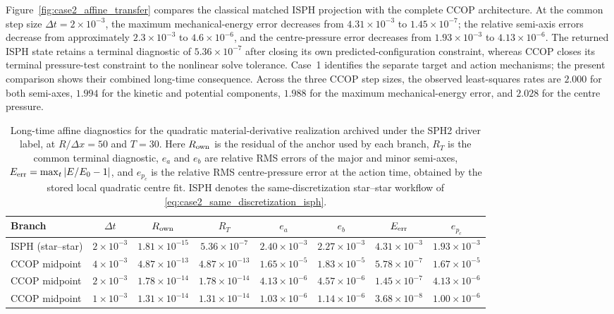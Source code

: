 \documentclass[11pt]{article}
\theoremstyle{plain}
\theoremstyle{definition}
\theoremstyle{remark}
\begin{document}
Figure~\ref{fig:case2_affine_transfer} compares the classical matched ISPH
projection with the complete CCOP architecture.  At the common step size
$\Delta t=2\times10^{-3}$, the maximum mechanical-energy error decreases from
$4.31\times10^{-3}$ to $1.45\times10^{-7}$; the relative semi-axis errors
decrease from approximately $2.3\times10^{-3}$ to $4.6\times10^{-6}$, and the
centre-pressure error decreases from $1.93\times10^{-3}$ to
$4.13\times10^{-6}$.  The returned ISPH state retains a terminal diagnostic of
$5.36\times10^{-7}$ after closing its own predicted-configuration constraint,
whereas CCOP closes its terminal pressure-test constraint to the nonlinear
solve tolerance.  Case~1 identifies the separate target and action mechanisms;
the present comparison shows their combined long-time consequence.  Across the
three CCOP step sizes, the observed
least-squares rates are $2.000$ for both semi-axes, $1.994$ for the kinetic and
potential components, $1.988$ for the maximum mechanical-energy error, and
$2.028$ for the centre pressure.

\begin{table}[t]
\centering
\caption{Long-time affine diagnostics for the quadratic material-derivative
realization archived under the SPH2 driver label, at
$R/\Delta x=50$ and $T=30$.  Here $R_{\rm own}$ is the residual of the anchor
used by each branch, $R_T$ is the common terminal diagnostic, $e_a$ and $e_b$
are relative RMS errors of the major and minor semi-axes,
$E_{\rm err}=\max_t|E/E_0-1|$, and $e_{p_c}$ is the relative RMS centre-pressure
error at the action time, obtained by the stored local quadratic centre fit.
ISPH denotes the same-discretization star--star workflow of
\eqref{eq:case2_same_discretization_isph}.}
\label{tab:case2_transfer_numbers}
\scriptsize
\setlength{\tabcolsep}{3.5pt}
\renewcommand{\arraystretch}{1.35}
\begin{tabular}{lccccccc}
\toprule
Branch & $\Delta t$ & $R_{\rm own}$ & $R_T$ & $e_a$ & $e_b$ &
$E_{\rm err}$ & $e_{p_c}$ \\
\midrule
ISPH (star--star) & $2{\times}10^{-3}$ & $1.81{\times}10^{-15}$ & $5.36{\times}10^{-7}$ & $2.40{\times}10^{-3}$ & $2.27{\times}10^{-3}$ & $4.31{\times}10^{-3}$ & $1.93{\times}10^{-3}$ \\
CCOP midpoint & $4{\times}10^{-3}$ & $4.87{\times}10^{-13}$ & $4.87{\times}10^{-13}$ & $1.65{\times}10^{-5}$ & $1.83{\times}10^{-5}$ & $5.78{\times}10^{-7}$ & $1.67{\times}10^{-5}$ \\
CCOP midpoint & $2{\times}10^{-3}$ & $1.78{\times}10^{-14}$ & $1.78{\times}10^{-14}$ & $4.13{\times}10^{-6}$ & $4.57{\times}10^{-6}$ & $1.45{\times}10^{-7}$ & $4.13{\times}10^{-6}$ \\
CCOP midpoint & $1{\times}10^{-3}$ & $1.31{\times}10^{-14}$ & $1.31{\times}10^{-14}$ & $1.03{\times}10^{-6}$ & $1.14{\times}10^{-6}$ & $3.68{\times}10^{-8}$ & $1.00{\times}10^{-6}$ \\
\bottomrule
\end{tabular}
\end{table}
\end{document}
